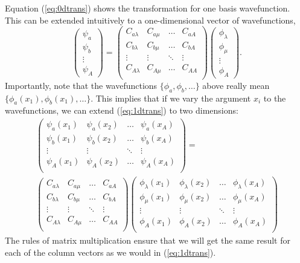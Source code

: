 \documentclass{article}
\newcommand{\pmat}[1]{\ensuremath{\begin{pmatrix}#1\end{pmatrix}}}
\begin{document}
\begin{enumerate}
		Equation (\ref{eq:0dtrans}) shows the transformation for one basis wavefunction. This can be extended intuitively to a one-dimensional vector of wavefunctions,
		\begin{equation}
			\pmat{\psi_a \\ \psi_b \\ \vdots \\ \psi_A} = 
				\begin{pmatrix}
					C_{a \lambda} & C_{a \mu} & \dots & C_{a A} \\
					C_{b \lambda} & C_{b \mu} & \dots & C_{b A} \\
					\vdots        & \vdots    & \ddots& \vdots  \\
					C_{A \lambda} & C_{A \mu} & \dots & C_{A A} \\
				\end{pmatrix}
				\pmat{\phi_\lambda \\ \phi_\mu \\ \vdots \\ \phi_A}.  \label{eq:1dtrans}
		\end{equation}
		Importantly, note that the wavefunctions $\{\phi_a, \phi_b, \dots\}$ above really mean $\{\phi_a (x_1), \phi_b (x_1), \dots\}$. This implies that if we vary the argument $x_i$ to the wavefunctions, we can extend (\ref{eq:1dtrans}) to two dimensions:
		\begin{multline}
			\begin{pmatrix}
				\psi_a (x_1) & \psi_a (x_2) & \dots & \psi_a(x_A) \\
				\psi_b (x_1) & \psi_b (x_2) & \dots & \psi_b(x_A) \\
				\vdots       & \vdots       & \ddots& \vdots      \\
				\psi_A (x_1) & \psi_A (x_2) & \dots & \psi_A(x_A) \\
			\end{pmatrix} = \\
			\begin{pmatrix}
				C_{a \lambda} & C_{a \mu} & \dots & C_{a A} \\
				C_{b \lambda} & C_{b \mu} & \dots & C_{b A} \\
				\vdots        & \vdots    & \ddots& \vdots  \\
				C_{A \lambda} & C_{A \mu} & \dots & C_{A A} \\
			\end{pmatrix}
			\begin{pmatrix}
			\phi_\lambda (x_1) & \phi_\lambda (x_2) & \dots & \phi_\lambda(x_A) \\
			\phi_\mu (x_1) & \phi_\mu (x_2) & \dots & \phi_\mu(x_A) \\
			\vdots       & \vdots       & \ddots& \vdots      \\
			\phi_A (x_1) & \phi_A (x_2) & \dots & \phi_A(x_A) \\
		\end{pmatrix}  \label{eq:2dtrans}
		\end{multline}
		The rules of matrix multiplication ensure that we will get the same result for each of the column vectors as we would in (\ref{eq:1dtrans}). 


\end{enumerate}
\end{document}
